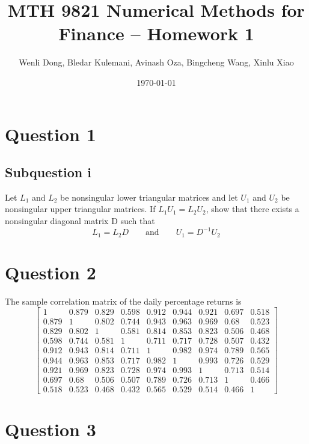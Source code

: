 \documentclass{article}
\title{MTH 9821 Numerical Methods for Finance -- Homework 1}
\author{Wenli Dong, Bledar Kulemani, Avinash Oza, Bingcheng Wang, Xinlu Xiao}
\date{\today}
\DeclareMathOperator{\1}{\mathit{1}}
\numberwithin{figure}{section} %
\begin{document}
\maketitle
\section{Question 1}

\subsection{Subquestion i} \label{sec:1}

Let $L_1$ and $L_2$ be nonsingular lower triangular matrices and let $U_1$ and $U_2$ be nonsingular upper triangular matrices. If $L_1U_1 = L_2U_2$, show that there exists a nonsingular diagonal matrix D such that 
\begin{equation} \label{eq:1}
L_1 = L_2D \qquad \mathrm{and} \qquad U_1 = D^{-1}U_2
\end{equation}

\section{Question 2}

The sample correlation matrix of the daily percentage returns is
	\[
	\begin{bmatrix}
	1 & 0.879 & 0.829 & 0.598 & 0.912 & 0.944 & 0.921 & 0.697 & 0.518\\
0.879 & 1 & 0.802 & 0.744 & 0.943 & 0.963 & 0.969 & 0.68 & 0.523\\
0.829 & 0.802 & 1 & 0.581 & 0.814 & 0.853 & 0.823 & 0.506 & 0.468\\
0.598 & 0.744 & 0.581 & 1 & 0.711 & 0.717 & 0.728 & 0.507 & 0.432\\
0.912 & 0.943 & 0.814 & 0.711 & 1 & 0.982 & 0.974 & 0.789 & 0.565\\
0.944 & 0.963 & 0.853 & 0.717 & 0.982 & 1 & 0.993 & 0.726 & 0.529\\
0.921 & 0.969 & 0.823 & 0.728 & 0.974 & 0.993 & 1 & 0.713 & 0.514\\
0.697 & 0.68 & 0.506 & 0.507 & 0.789 & 0.726 & 0.713 & 1 & 0.466\\
0.518 & 0.523 & 0.468 & 0.432 & 0.565 & 0.529 & 0.514 & 0.466 & 1
	\end{bmatrix}
	\]
	
\section{Question 3}
\end{document}
